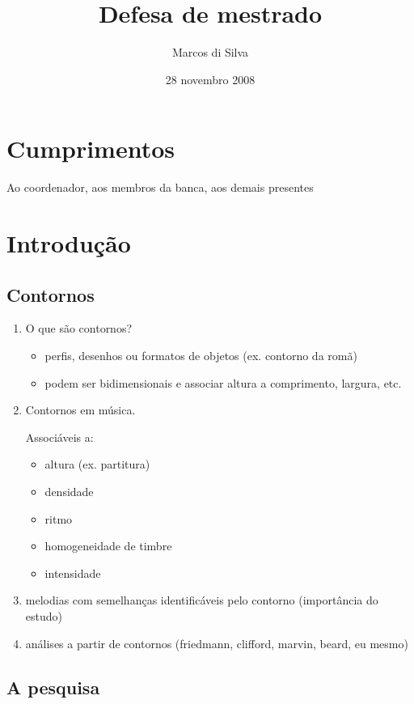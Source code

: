 \documentclass[12pt,a4paper]{article}
\title{Defesa de mestrado}
\author{Marcos di Silva}
\date{28 novembro 2008}
\begin{document}
\maketitle

\section*{Cumprimentos}

Ao coordenador, aos membros da banca, aos demais presentes

\section{Introdução}

\subsection{Contornos}

\begin{enumerate}
\item O que são contornos?
  \begin{itemize}
  \item perfis, desenhos ou formatos de objetos (ex. contorno da romã)
  \item podem ser bidimensionais e associar altura a comprimento,
    largura, etc.
  \end{itemize}
\item Contornos em música.

  Associáveis a:
  \begin{itemize}
  \item altura (ex. partitura)
  \item densidade
  \item ritmo
  \item homogeneidade de timbre
  \item intensidade
  \end{itemize}
\item melodias com semelhanças identificáveis pelo contorno
  (importância do estudo)
\item análises a partir de contornos (friedmann, clifford, marvin, beard, eu mesmo)
\end{enumerate}

\subsection{A pesquisa}
\end{document}
